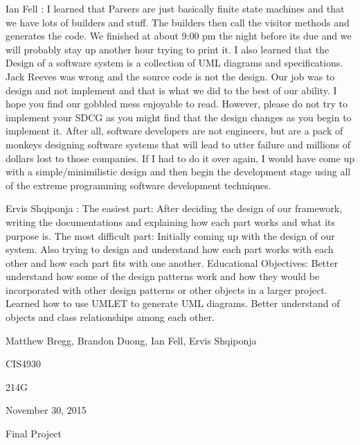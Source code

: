 \documentclass{article}
\begin{document}
\begin{list}{Learning Experiance, }{}
\item Ian Fell : I learned that Parsers are just basically finite state machines and that we have lots of builders and stuff. The builders then call the visitor methods and generates the code. We finished at about 9:00 pm the night before its due and we will probably stay up another hour trying to print it. I also learned that the Design of a software system is a collection of UML diagrams and specifications. Jack Reeves was wrong and the source code is not the design. Our job was to design and not implement and that is what we did to the best of our ability. I hope you find our gobbled mess enjoyable to read. However, please do not try to implement your SDCG as you might find that the design changes as you begin to implement it. After all, software developers are not engineers, but are a pack of monkeys designing software systems that will lead to utter failure and millions of dollars lost to those companies. If I had to do it over again, I would have come up with a simple/minimilistic design and then begin the development stage using all of the extreme programming software development techniques.
\item Ervis Shqiponja : The easiest part: After deciding the design of our framework, writing the documentations and explaining how each part works and what its purpose is.
The most difficult part: Initially coming up with the design of our system. Also trying to design and understand how each part works with each other and how each part fits with one another.
Educational Objectives: Better understand how some of the design patterns work and how they would be incorporated with other design patterns or other objects in a larger project. Learned how to use UMLET to generate UML diagrams. Better understand of objects and class relationships among each other.

\end{list}
\newpage

\begin{flushright}
Matthew Bregg, Brandon Duong,  Ian Fell, Ervis Shqiponja
\end{flushright}
\begin{flushright}
CIS4930
\end{flushright}
\begin{flushright}
214G
\end{flushright}
\begin{flushright}
November 30, 2015
\end{flushright}
\begin{flushright}
Final Project
\end{flushright}
\end{document}
